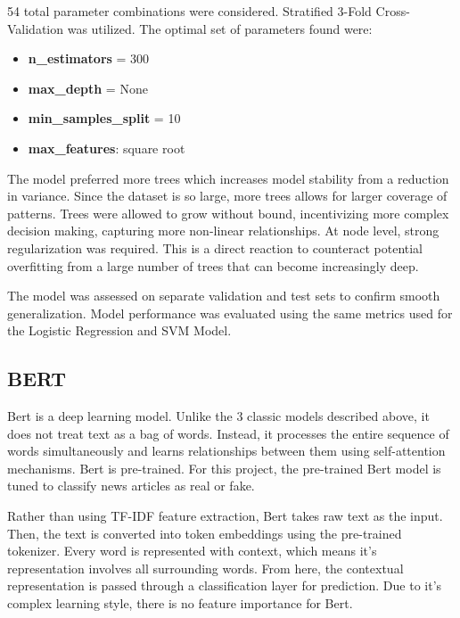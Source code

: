 \documentclass{article}
\begin{document}
54 total parameter combinations were considered. Stratified 3-Fold Cross-Validation was utilized. The optimal set of parameters found were: 

\begin{itemize}

\item \textbf{n\_estimators} = 300

    \item \textbf{max\_depth} = None

    \item \textbf{min\_samples\_split} = 10

    \item \textbf{max\_features}: square root

\end{itemize}

The model preferred more trees which increases model stability from a reduction in variance. Since the dataset is so large, more trees allows for larger coverage of patterns. Trees were allowed to grow without bound, incentivizing more complex decision making, capturing more non-linear relationships. At node level, strong regularization was required. This is a direct reaction to counteract potential overfitting from a large number of trees that can become increasingly deep. 

The model was assessed on separate validation and test sets to confirm smooth generalization. Model performance was evaluated using the same metrics used for the Logistic Regression and SVM Model.

\subsection{BERT}
Bert is a deep learning model. Unlike the 3 classic models described above, it does not treat text as a bag of words. Instead, it processes the entire sequence of words simultaneously and learns relationships between them using self-attention mechanisms. Bert is pre-trained. For this project, the pre-trained Bert model is tuned to classify news articles as real or fake. 

Rather than using TF-IDF feature extraction, Bert takes raw text as the input. Then, the text is converted into token embeddings using the pre-trained tokenizer. Every word is represented with context, which means it’s representation involves all surrounding words. From here, the contextual representation is passed through a classification layer for prediction. Due to it’s complex learning style, there is no feature importance for Bert. 
\end{document}
